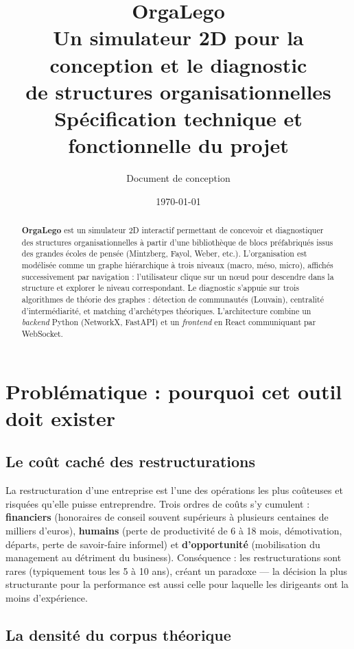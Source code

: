 \documentclass[11pt,a4paper]{article}
\title{\Huge \textbf{OrgaLego} \\[0.3cm]
\Large Un simulateur 2D pour la conception et le diagnostic\\ de structures organisationnelles\\[0.3cm]
\large Spécification technique et fonctionnelle du projet}
\author{Document de conception}
\date{\today}
\begin{document}
\maketitle

\begin{abstract}
\noindent \textbf{OrgaLego} est un simulateur 2D interactif permettant de concevoir et diagnostiquer des structures organisationnelles à partir d'une bibliothèque de blocs préfabriqués issus des grandes écoles de pensée (Mintzberg, Fayol, Weber, etc.). L'organisation est modélisée comme un graphe hiérarchique à trois niveaux (macro, méso, micro), affichés successivement par navigation : l'utilisateur clique sur un nœud pour descendre dans la structure et explorer le niveau correspondant. Le diagnostic s'appuie sur trois algorithmes de théorie des graphes : détection de communautés (Louvain), centralité d'intermédiarité, et matching d'archétypes théoriques. L'architecture combine un \textit{backend} Python (NetworkX, FastAPI) et un \textit{frontend} en React communiquant par WebSocket.
\end{abstract}

\tableofcontents
\newpage

\section{Problématique : pourquoi cet outil doit exister}

\subsection{Le coût caché des restructurations}

La restructuration d'une entreprise est l'une des opérations les plus coûteuses et risquées qu'elle puisse entreprendre. Trois ordres de coûts s'y cumulent : \textbf{financiers} (honoraires de conseil souvent supérieurs à plusieurs centaines de milliers d'euros), \textbf{humains} (perte de productivité de 6 à 18 mois, démotivation, départs, perte de savoir-faire informel) et \textbf{d'opportunité} (mobilisation du management au détriment du business). Conséquence : les restructurations sont rares (typiquement tous les 5 à 10 ans), créant un paradoxe --- la décision la plus structurante pour la performance est aussi celle pour laquelle les dirigeants ont la moins d'expérience.

\subsection{La densité du corpus théorique}
\end{document}
